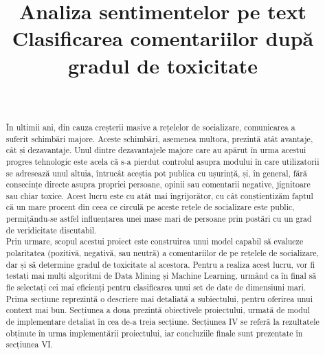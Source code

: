 \documentclass{article}
\begin{document}
\title{
Analiza sentimentelor pe text\\
{\normalsize
Clasificarea comentariilor după gradul de toxicitate
}
}

\author{
 \\
}

\maketitle

\begin{abstract}

{\large
În ultimii ani, din cauza creșterii masive a rețelelor de socializare, comunicarea a suferit schimbări majore. Aceste schimbări, asemenea multora, prezintă atât avantaje, cât și dezavantaje. Unul dintre dezavantajele majore care au apărut în urma acestui progres tehnologic este acela că s-a pierdut controlul asupra modului în care utilizatorii se adresează unul altuia, întrucât aceștia pot publica cu ușurință, și, în general, fără consecințe directe asupra propriei persoane, opinii sau comentarii negative, jignitoare sau chiar toxice. 
Acest lucru este cu atât mai îngrijorător, cu cât conștientizăm faptul că un mare procent din ceea ce circulă pe aceste rețele de socializare este public, permițându-se astfel influențarea unei mase mari de persoane prin postări cu un grad de veridicitate discutabil. \\
\tab Prin urmare, scopul acestui proiect este construirea unui model capabil să evalueze polaritatea (pozitivă, negativă, sau neutră) a comentariilor de pe rețelele de socializare, dar și să determine gradul de toxicitate al acestora. Pentru a realiza acest lucru, vor fi testați mai mulți algoritmi de Data Mining și Machine Learning, urmând ca în final să fie selectați cei mai eficienți pentru clasificarea unui set de date de dimensiuni mari. \\
Prima secțiune reprezintă o descriere mai detaliată a subiectului, pentru oferirea unui context mai bun. Secțiunea a doua prezintă obiectivele proiectului, urmată de modul de implementare detaliat în cea de-a treia secțiune. Secțiunea IV se referă la rezultatele obținute în urma implementării proiectului, iar concluziile finale sunt prezentate în secțiunea VI.
}

\end{abstract}
\end{document}
